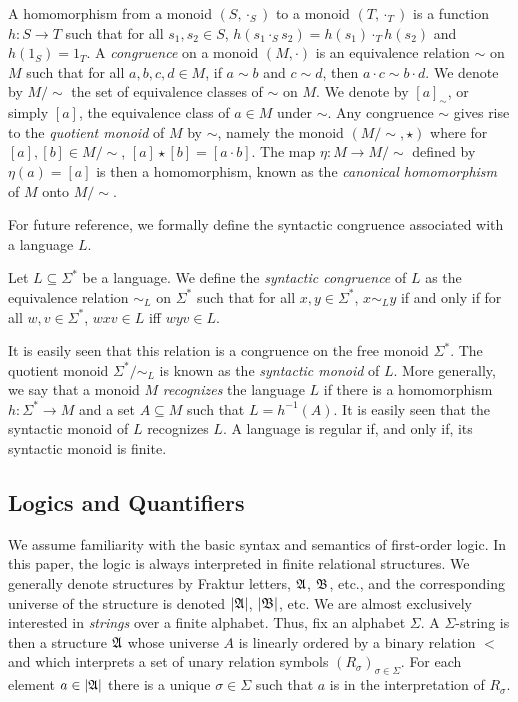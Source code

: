 \documentclass[a4paper,UKenglish,cleveref, autoref, thm-restate, anonymous]{lipics-v2021}
\begin{document}
A homomorphism from a monoid $(S, \cdot_S)$ to a monoid $(T, \cdot_T)$ is a function $h : S \rightarrow T$ such that for all $s_1, s_2 \in S$, $h(s_1 \cdot_S s_2) = h(s_1) \cdot_T h(s_2)$ and $h(1_S) = 1_T$.     A \emph{congruence} on a monoid $(M, \cdot)$ is an equivalence relation $\sim$ on $M$ such that for all $a,b,c,d \in M$, if $a \sim b$ and $c \sim d$, then $a \cdot c \sim b \cdot d$.  We denote by $M/{\sim}$ the set of equivalence classes of $\sim$ on $M$.  We denote by $[a]_{\sim}$, or simply $[a]$, the equivalence class of $a \in M$ under $\sim$.  Any congruence $\sim$ gives rise to the \emph{quotient monoid} of $M$ by $\sim$, namely the monoid $(M/{\sim}, \star)$ where for $[a],[b] \in M/{\sim}$, $[a] \star [b] = [a \cdot b]$.  The map $\eta : M \rightarrow M/{\sim}$ defined by $\eta(a) = [a]$ is then a homomorphism, known as the  \emph{canonical homomorphism} of $M$ onto $M/{\sim}$.

For future reference, we formally define the syntactic congruence associated with a language $L$.
\begin{definition}\label{def:syncong}
  Let $L \subseteq \Sigma^*$ be a language. We define the \emph{syntactic congruence} of $L$ as the equivalence relation $\sim_L$ on $\Sigma^*$ such that for all $x, y \in \Sigma^*$, $x \sim_L y$ if and only if for all $w,v \in \Sigma^*$, $wxv \in L$ iff $wyv \in L$.
  \end{definition}
 It is easily seen that this relation is a congruence on the free monoid $\Sigma^*$.  The quotient monoid $\Sigma^*/{\sim_L}$ is known as the \emph{syntactic monoid} of $L$.  More generally, we say that a monoid $M$ \emph{recognizes} the language $L$ if there is a homomorphism $h: \Sigma^* \rightarrow M$ and a set $A \subseteq M$ such that $L = h^{-1}(A)$.  It is easily seen that the syntactic monoid of $L$ recognizes $L$.  A language is regular if, and only if, its syntactic monoid is finite.

\subsection{Logics and Quantifiers}\label{sec:backgroundmult}

We assume familiarity with the basic syntax and semantics of first-order logic.  In this paper, the logic is always interpreted in finite relational structures.  We generally denote structures by Fraktur letters, $\mathfrak{A}$, $\mathfrak{B}$, etc., and the corresponding universe of the structure is denoted $|\mathfrak{A}|$, $|\mathfrak{B}|$, etc.
We are almost exclusively interested in \emph{strings} over a finite alphabet.  Thus, fix an alphabet $\Sigma$.  A $\Sigma$-string is then a structure $\mathfrak{A}$ whose universe $A$ is linearly ordered by a binary relation $<$ and which interprets a set of unary relation symbols $(R_{\sigma})_{\sigma \in \Sigma}$.  For each element $a \in |\mathfrak{A}|$ there is a unique $\sigma \in \Sigma$ such that $a$ is in the interpretation of $R_{\sigma}$.
\end{document}
